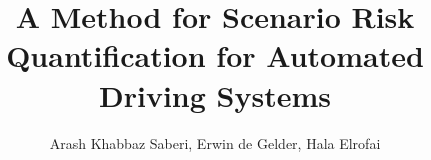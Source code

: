 \documentclass[letterpaper, 10 pt, conference]{ieeeconf}  %
\title{\LARGE \bf
A Method for Scenario Risk Quantification for Automated Driving Systems
}
\author{Arash Khabbaz Saberi, Erwin de Gelder, Hala Elrofai}
\begin{document}
\maketitle
\thispagestyle{empty}
\pagestyle{empty}


\begin{abstract}
	
	



	


\end{abstract}
\end{document}
